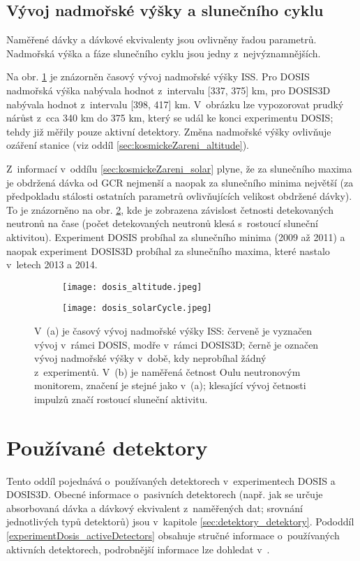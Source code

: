 \subsection{Vývoj nadmořské výšky a slunečního cyklu}\label{sec:dosis_altitudeSlunecniCyklus} %
Naměřené dávky a dávkové ekvivalenty jsou ovlivněny řadou parametrů. Nadmořská výška a fáze slunečního cyklu jsou jedny z~nejvýznamnějších. 

Na obr. \ref{subfig:dosis_altitude} je znázorněn časový vývoj nadmořské výšky ISS. Pro DOSIS nadmořská výška nabývala hodnot z~intervalu [337, 375] km, pro DOSIS3D nabývala hodnot z~intervalu [398, 417] km. V~obrázku lze vypozorovat prudký nárůst z~cca 340 km do 375 km, který se udál ke konci experimentu DOSIS; tehdy již měřily pouze aktivní detektory. Změna nadmořské výšky ovlivňuje ozáření stanice (viz oddíl \ref{sec:kosmickeZareni_altitude}). 

Z~informací v~oddílu \ref{sec:kosmickeZareni_solar} plyne, že za slunečního maxima je obdržená dávka od GCR nejmenší a naopak za slunečního minima největší (za předpokladu stálosti ostatních parametrů ovlivňujících velikost obdržené dávky). To je znázorněno na obr. \ref{subfig:dosis_solarCycle}, kde je zobrazena závislost četnosti detekovaných neutronů na čase (počet detekovaných neutronů klesá s~rostoucí sluneční aktivitou). Experiment DOSIS probíhal za slunečního minima (2009 až 2011) a naopak experiment DOSIS3D probíhal za slunečního maxima, které nastalo v~letech 2013 a 2014.   
\begin{figure}[h]
  \centering
  \begin{subfigure}{0.45\textwidth}
	\texttt{[image: dosis\_altitude.jpeg]}
	\caption{}
	\label{subfig:dosis_altitude}
  \end{subfigure}
  \begin{subfigure}{0.45\textwidth}
	\texttt{[image: dosis\_solarCycle.jpeg]}
	\caption{}
	\label{subfig:dosis_solarCycle}
  \end{subfigure}
  \caption{V~(a) je časový vývoj nadmořské výšky ISS: červeně je vyznačen vývoj v~rámci DOSIS, modře v~rámci DOSIS3D; černě je označen vývoj nadmořské výšky v~době, kdy neprobíhal žádný z~experimentů. V~(b) je naměřená četnost Oulu neutronovým monitorem, značení je stejné jako v~(a); klesající vývoj četnosti impulzů značí rostoucí sluneční aktivitu. \cite{dosis}} 
  \label{fig:dosis_parameters}
\end{figure}

\section{Používané detektory}%
Tento oddíl pojednává o~používaných detektorech v~experimentech DOSIS a DOSIS3D. Obecné informace o~pasivních detektorech (např. jak se určuje absorbovaná dávka a dávkový ekvivalent z~naměřených dat; srovnání jednotlivých typů detektorů) jsou v~kapitole \ref{sec:detektory_detektory}. Pododdíl \ref{experimentDosis_activeDetectors} obsahuje stručné informace o~používaných aktivních detektorech, podrobnější informace lze dohledat v~\cite{activeDetectors,dosis2}.

